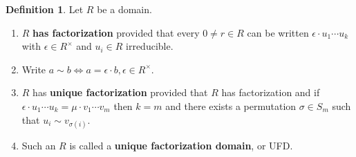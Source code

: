 \documentclass{amsart}
\theoremstyle{definition}
\newtheorem{defn}[thm]{Definition}
\theoremstyle{remark}
\begin{document}
\begin{defn}
Let $R$ be a domain. \hspace{0.5cm}
\begin{enumerate}
\item $R$ \textbf{has factorization} provided that every $0 \neq r \in R$ can be written $\epsilon \cdot u_1 \cdots u_k$ with $\epsilon \in R^{\times}$ and $u_i \in R$ irreducible.
\item Write $a \sim b \Leftrightarrow a = \epsilon \cdot b, \epsilon \in R^{\times}$.
\item $R$ has \textbf{unique factorization} provided that $R$ has factorization and if $\epsilon \cdot u_1 \cdots u_k = \mu \cdot v_1 \cdots v_m$ then $k = m$ and there exists a permutation $\sigma \in S_m$ such that $u_i \sim v_{\sigma(i)}$.
\item Such an $R$ is called a \textbf{unique factorization domain}, or UFD.
\end{enumerate}
\end{defn}
\end{document}
